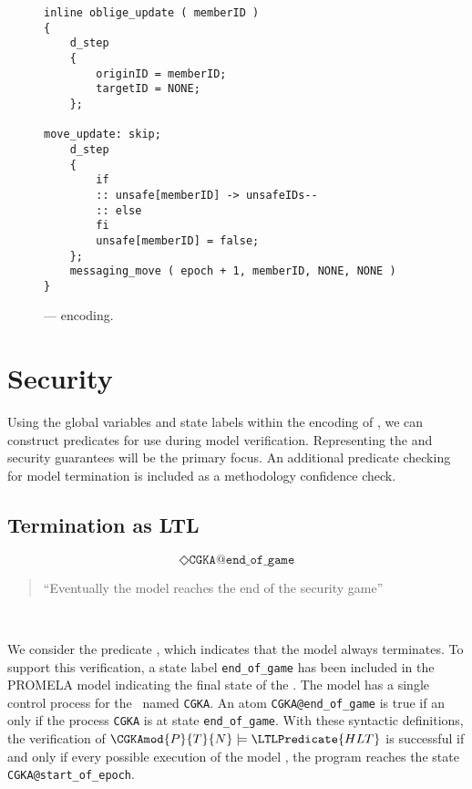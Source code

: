 \begin{figure}[ht!]
  \centering
  \caption{\label{fig:Oracle-Update}\CGKAmod{}{}{} ---  encoding.}
\begin{verbatim}
inline oblige_update ( memberID )
{
    d_step
    {
        originID = memberID;
        targetID = NONE;
    };

move_update: skip;
    d_step
    {
        if
        :: unsafe[memberID] -> unsafeIDs--
        :: else
        fi
        unsafe[memberID] = false;
    };
    messaging_move ( epoch + 1, memberID, NONE, NONE )
}
\end{verbatim}
\end{figure}


\hypertarget{sec:LTL-security}{%
\section{Security}\label{sec:LTL-security}}

Using the global variables and state labels within the encoding of , we can construct  predicates for use during model verification.
Representing the  and  security guarantees will be the primary focus.
An additional predicate checking for model termination is included as a methodology confidence check.


\hypertarget{sec:hlt-as-ltl}{%
\subsection{Termination as LTL}\label{sec:hlt-as-ltl}}

\begin{LTL}
\[
    \Diamond \texttt{CGKA@end\_of\_game}
\]
\begin{quotation}
``Eventually the model reaches the end of the \CGKAsec security game''
\end{quotation}\\
\end{LTL}

We consider the  predicate , which indicates that the  model always terminates.
To support this verification, a state label \texttt{end\_of\_game} has been included in the PROMELA model indicating the final state of the \CGKAsec. 
The model has a single control process for the \CGKAsec\ named \texttt{CGKA}.
An  atom \texttt{CGKA@end\_of\_game} is true if an only if the process \texttt{CGKA} is at state \texttt{end\_of\_game}.
With these syntactic definitions, the verification of \(\CGKAmod{P}{T}{N} \models \LTLPredicate{HLT}\) is successful if and only if every possible execution of the model \CGKAmod{}{}{}, the program reaches the state \texttt{CGKA@start\_of\_epoch}.



